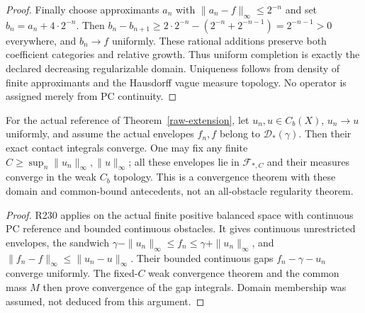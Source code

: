 \begin{proof}
Finally choose approximants $a_n$ with $\|a_n-f\|_\infty\leq2^{-n}$
and set $b_n=a_n+4\cdot2^{-n}$. Then
$b_n-b_{n+1}\geq2\cdot2^{-n}-(2^{-n}+2^{-n-1})=2^{-n-1}>0$
everywhere, and $b_n\to f$ uniformly. These rational additions preserve
both coefficient categories and relative growth. Thus uniform completion
is exactly the declared decreasing regularizable domain. Uniqueness
follows from density of finite approximants and the Hausdorff vague
measure topology. No operator is assigned merely from PC continuity.
\end{proof}

\begin{corollary}\label{contact-stability}
For the actual reference of Theorem~\ref{raw-extension}, let $u_n,u\in C_b(X)$,
$u_n\to u$ uniformly, and assume the actual envelopes $f_n,f$ belong to
$\mathcal D_*(\gamma)$. Then their exact contact integrals converge.
One may fix any finite $C\geq\sup_n\|u_n\|_\infty,\|u\|_\infty$;
all these envelopes lie in $\mathcal F_{*,C}$ and their measures converge
in the weak $C_b$ topology. This is a convergence theorem with these
domain and common-bound antecedents, not an all-obstacle regularity theorem.
\end{corollary}
\begin{proof}
R230 applies on the actual finite positive balanced space with continuous
PC reference and bounded continuous obstacles. It gives continuous
unrestricted envelopes, the sandwich $\gamma-\|u_n\|_\infty\leq f_n
\leq\gamma+\|u_n\|_\infty$, and $\|f_n-f\|_\infty\leq\|u_n-u\|_\infty$.
Their bounded continuous gaps $f_n-\gamma-u_n$ converge uniformly.
The fixed-$C$ weak convergence theorem and the common mass $M$ then
prove convergence of the gap integrals. Domain membership was assumed,
not deduced from this argument.
\end{proof}
